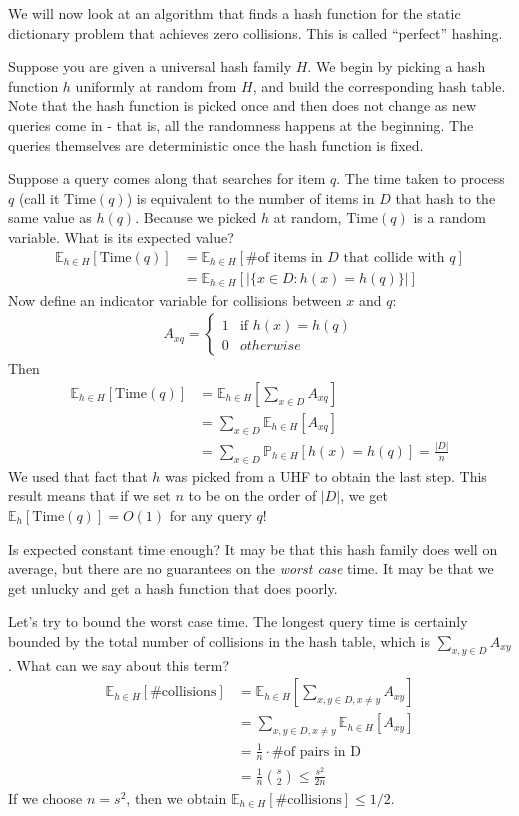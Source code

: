 \documentclass[11pt]{article}
\begin{document}
We will now look at an algorithm that finds a hash function for the static dictionary problem that achieves zero collisions. This is called ``perfect'' hashing.

Suppose you are given a universal hash family $H$. We begin by picking a hash function $h$ uniformly at random from $H$, and build the corresponding hash table. Note that the hash function is picked once and then does not change as new queries come in - that is, all the randomness happens at the beginning. The queries themselves are deterministic once the hash function is fixed.

Suppose a query comes along that searches for item $q$. The time taken to process $q$ (call it $\text{Time}(q)$) is equivalent to the number of items in $D$ that hash to the same value as $h(q)$. Because we picked $h$ at random, $\text{Time}(q)$ is a random variable. What is its expected value?
%
\begin{align*}
	\mathbb{E}_{h\in H}[\text{Time}(q)]
		&= \mathbb{E}_{h\in H}[\text{\#of items in $D$ that collide with $q$}] \\
		&= \mathbb{E}_{h\in H}[|\{x \in D : h(x)=h(q)\}|]
\end{align*}
%
Now define an indicator variable for collisions between $x$ and $q$:
%
\begin{align*}
	A_{xq} = \begin{cases}
		1&\text{if $h(x)=h(q)$} \\
		0&otherwise
	\end{cases}
\end{align*}
%
Then
%
\begin{align*}
	\mathbb{E}_{h\in H}[\text{Time}(q)]
		&= \mathbb{E}_{h\in H}\left[\sum_{x\in D} A_{xq}\right] \\
		&= \sum_{x\in D} \mathbb{E}_{h\in H}[A_{xq}] \\
		&= \sum_{x\in D} \mathbb{P}_{h\in H}[h(x)=h(q)] = \frac{|D|}{n}
\end{align*}
%
We used that fact that $h$ was picked from a UHF to obtain the last step. This result means that if we set $n$ to be on the order of $|D|$, we get $\mathbb{E}_h[\text{Time}(q)]=O(1)$ for any query $q$!

Is expected constant time enough? It may be that this hash family does well on average, but there are no guarantees on the \emph{worst case} time. It may be that we get unlucky and get a hash function that does poorly.

Let's try to bound the worst case time. The longest query time is certainly bounded by the total number of collisions in the hash table, which is $\sum_{x,y\in D} A_{xy}$. What can we say about this term?
%
\begin{align*}
	\mathbb{E}_{h\in H} [\text{\#collisions}]
		&= \mathbb{E}_{h\in H} \left[\sum_{x,y\in D,x\neq y} A_{xy}\right] \\
		&= \sum_{x,y\in D,x\neq y}  \mathbb{E}_{h\in H} [A_{xy}] \\
		&= \frac{1}{n} \cdot \text{\#of pairs in D} \\
		&= \frac{1}{n} \binom{s}{2} \leq \frac{s^2}{2n}
\end{align*}
%
If we choose $n=s^2$, then we obtain $\mathbb{E}_{h\in H} [\text{\#collisions}] \leq 1/2$.
\end{document}
